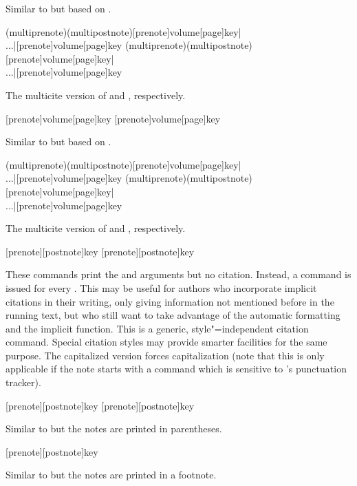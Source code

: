 \begin{ltxsyntax}
Similar to  but based on .

(multiprenote)(multipostnote)[prenote]{volume}[page]{key}|\\...|[prenote]{volume}[page]{key}
(multiprenote)(multipostnote)[prenote]{volume}[page]{key}|\\...|[prenote]{volume}[page]{key}

The multicite version of  and , respectively.

[prenote]{volume}[page]{key}
[prenote]{volume}[page]{key}

Similar to  but based on .

(multiprenote)(multipostnote)[prenote]{volume}[page]{key}|\\...|[prenote]{volume}[page]{key}
(multiprenote)(multipostnote)[prenote]{volume}[page]{key}|\\...|[prenote]{volume}[page]{key}

The multicite version of  and , respectively.

[prenote][postnote]{key}
[prenote][postnote]{key}

These commands print the  and  arguments but no citation. Instead, a  command is issued for every . This may be useful for authors who incorporate implicit citations in their writing, only giving information not mentioned before in the running text, but who still want to take advantage of the automatic  formatting and the implicit  function. This is a generic, style"=independent citation command. Special citation styles may provide smarter facilities for the same purpose. The capitalized version forces capitalization (note that this is only applicable if the note starts with a command which is sensitive to \biblatex's punctuation tracker).

[prenote][postnote]{key}
[prenote][postnote]{key}

Similar to  but the notes are printed in parentheses.

[prenote][postnote]{key}

Similar to  but the notes are printed in a footnote.

\end{ltxsyntax}

